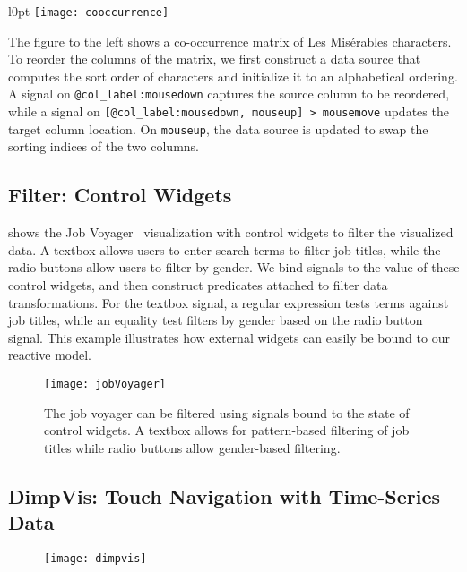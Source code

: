 \begin{wrapfigure}{l}{0pt}
  \texttt{[image: cooccurrence]}
\end{wrapfigure}

The figure to the left shows a co-occurrence matrix of Les Mis\'{e}rables
characters. To reorder the columns of the matrix, we first construct a data
source that computes the sort order of characters and initialize it to an
alphabetical ordering. A signal on \texttt{@col\_label:mousedown} captures the
source column to be reordered, while a signal on \texttt{[@col\_label:mousedown,
mouseup] > mousemove} updates the target column location. On \texttt{mouseup},
the data source is updated to swap the sorting indices of the two columns.

\subsection{Filter: Control Widgets}

 shows the Job Voyager~\cite{heer:voyagers}
visualization with control widgets to filter the visualized data. A textbox
allows users to enter search terms to filter job titles, while the radio buttons
allow users to filter by gender. We bind signals to the value of these control
widgets, and then construct predicates attached to filter data transformations.
For the textbox signal, a regular expression tests terms against job titles,
while an equality test filters by gender based on the radio button signal. This
example illustrates how external widgets can easily be bound to our reactive
model.

\begin{figure}[h!]
  \centering
  \texttt{[image: jobVoyager]}
  \caption{The job voyager can be filtered using signals bound to the state of
  control widgets. A textbox allows for pattern-based filtering of job titles
  while radio buttons allow gender-based filtering.}
  \label{fig:vg:jobVoyager}
\end{figure}

\subsection{DimpVis: Touch Navigation with Time-Series Data}

\begin{figure}[h!]
  \centering
  \texttt{[image: dimpvis]}
\end{figure}

